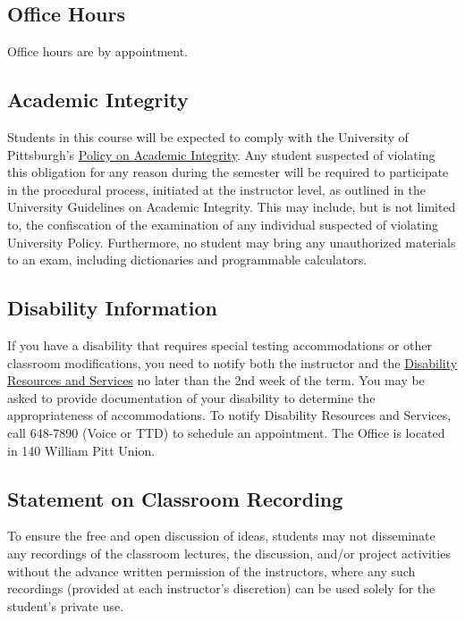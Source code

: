 \documentclass[11pt,english]{article}
\begin{document}
\subsection*{Office Hours}
Office hours are by appointment.

\subsection*{Academic Integrity}
Students in this course will be expected to comply with the University of Pittsburgh's \href{http://www.pitt.edu/~provost/ai1.html}{Policy on Academic Integrity}. Any student suspected of violating this obligation for any reason during the semester will be required to participate in the procedural process, initiated at the instructor level, as outlined in the University Guidelines on Academic Integrity. This may include, but is not limited to, the confiscation of the examination of any individual suspected of violating University Policy. Furthermore, no student may bring any unauthorized materials to an exam, including dictionaries and programmable calculators.

\subsection*{Disability Information}
If you have a disability that requires special testing accommodations or other classroom modifications, you need to notify both the instructor and the \href{http://www.drs.pitt.edu/policies.html}{Disability Resources and Services} no later than the 2nd week of the term. You may be asked to provide documentation of your disability to determine the appropriateness of accommodations. To notify Disability Resources and Services, call 648-7890 (Voice or TTD) to schedule an appointment. The Office is located in 140 William Pitt Union.

\subsection*{Statement on Classroom Recording}
To ensure the free and open discussion of ideas, students may not disseminate any recordings of the classroom lectures, the discussion, and/or project activities without the advance written permission of the instructors, where any such recordings (provided at each instructor's discretion) can be used solely for the student's private use.
\end{document}
